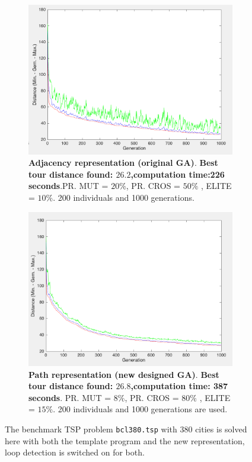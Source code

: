 \begin{figure}[!]
\centering
\begin{subfigure}{0.45\textwidth}
  \centering
    \includegraphics[width=1\textwidth]{../figures/figures_question_4/adj_vraag4_on_gen}
      \caption{\textbf{Adjacency representation (original GA)}. \textbf{Best tour distance found: $\mathbf{26.2}$,computation time:226 seconds}.PR. MUT = $20\%$, PR. CROS = $50\%$ , ELITE = $10\%$. 200 individuals and 1000 generations.}
      \label{fig:adj_vraag4_on_gen}
\end{subfigure}%
\hspace{0.05\textwidth}
\begin{subfigure}{0.45\textwidth}
  \centering
    \includegraphics[width=1\textwidth]{../figures/figures_question_4/path_vraag4_on_gen}
      \caption{\textbf{Path representation (new designed GA)}. \textbf{Best tour distance found:  $\mathbf{26.8}$,computation time: 387 seconds}. PR. MUT = $8\%$, PR. CROS = $80\%$ , ELITE = $15\%$. 200 individuals and 1000 generations are used.}
      \label{fig:path_vraag4_on_gen}
\end{subfigure}
\caption{The benchmark TSP problem \texttt{bcl380.tsp} with 380 cities is solved here with both the template program and the new representation, loop detection is switched on for both.}
\label{fig:tour380_on}
\end{figure}
